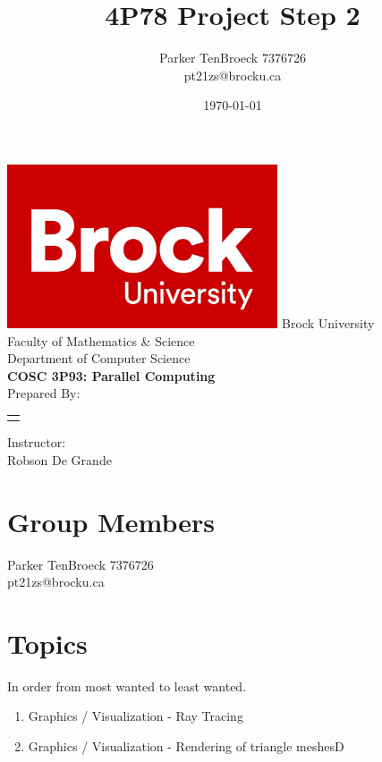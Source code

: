 \documentclass[12pt]{article}
\begin{document}
\title{4P78 Project Step 2}
\author{
    Parker TenBroeck 7376726\\
    pt21zs@brocku.ca
}
\date{\today}

\makeatletter
\begin{titlepage}
	\def \LOGOPATH {brock.jpg}
	\def \UNIVERSITY {Brock University}
	\def \FACULTY {Faculty of Mathematics \& Science}
	\def \DEPARTMENT {Department of Computer Science}
	\def \COURSETITLE {COSC 3P93: Parallel Computing}
	\def \SUPERVISOR {Robson De Grande}
	
	
	\vfill
	\begin{center}
		\includegraphics[width=0.6\textwidth]{brock.jpg}
		\fontsize{14pt}{14pt}\selectfont
		\vfill
		\UNIVERSITY \\
		\FACULTY \\
		\DEPARTMENT \\
		\vfill
		\fontsize{18pt}{18pt}\selectfont
		\textbf{\COURSETITLE} \\[0.5cm]
		\textbf{\@title}
		\vfill
		\fontsize{14pt}{14pt}\selectfont
		Prepared By: \\[0.5cm]
		
		\begin{tabular}[t]{c}
			\@author
		\end{tabular}\par
	
	    \vfill
		Instructor: \\
		\SUPERVISOR
		\vfill
		\@date
	\end{center}
\end{titlepage}
\makeatother

\newpage

\section{Group Members}
Parker TenBroeck 7376726\\
pt21zs@brocku.ca


\section{Topics}

In order from most wanted to least wanted.

\begin{enumerate}
\item Graphics / Visualization - Ray Tracing
\item Graphics / Visualization - Rendering of triangle meshesD
\end{enumerate}


%
%
\end{document}
